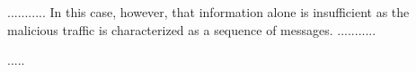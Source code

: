 \documentclass[sigconf,review, anonymous]{acmart}
\begin{document}
...........
In this case, however, that information alone is
insufficient as the malicious traffic is characterized as a sequence
of messages. 
...........



\begin{figure}[h]
  \vspace{-2ex}
  
  \vspace{-2ex}  
\end{figure}


\noindent

.....
\end{document}
